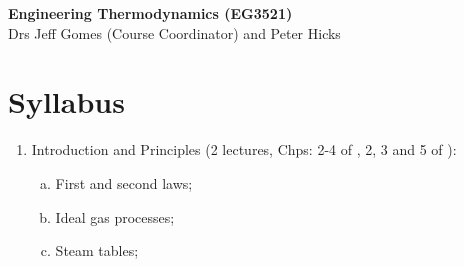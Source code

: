 \documentclass[11pt,oneside,a4paper]{article}
\begin{document}
\setcounter{page}{1}

\begin{center}
{\bf {\Large Engineering Thermodynamics (EG3521)}}\\
{\large Drs Jeff Gomes (Course Coordinator) and Peter Hicks}
\end{center}


\section{ Syllabus }

\begin{enumerate}[{\bf Module 1:}]
%
\item Introduction and Principles (2 lectures, Chps: 2-4 of \cite{smith_2001}, 2, 3 and 5 of \cite{borgnakke_2013}):
\begin{enumerate}[(a)]
\item First and second laws;
\item Ideal gas processes;
\item Steam tables; 
\end{enumerate}


\end{enumerate}
\end{document}
